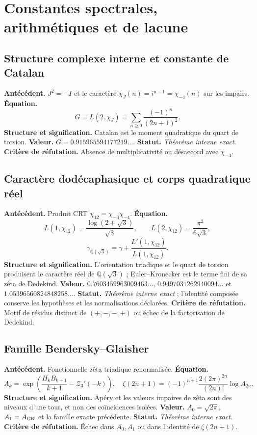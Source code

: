 \section{Constantes spectrales, arithmétiques et de lacune}

\subsection*{Structure complexe interne et constante de Catalan }
\textbf{Antécédent.} \(J^2=-I\) et le caractère
\(\chi_J(n)=i^{n-1}=\chi_{-4}(n)\) sur les impairs. \textbf{Équation.}
\[
G=L(2,\chi_J)=\sum_{n\ge0}\frac{(-1)^n}{(2n+1)^2}.
\]
\textbf{Structure et signification.} Catalan est le moment quadratique du
quart de torsion. \textbf{Valeur.} \(G=0.915965594177219\ldots\).
\textbf{Statut.} \emph{Théorème interne exact}. \textbf{Critère de réfutation.} Absence de
multiplicativité ou désaccord avec \(\chi_{-4}\).

\subsection*{Caractère dodécaphasique et corps quadratique réel }
\textbf{Antécédent.} Produit CRT
\(\chi_{12}=\chi_{-3}\chi_{-4}\). \textbf{Équation.}
\[
L(1,\chi_{12})=\frac{\log(2+\sqrt3)}{\sqrt3},
\qquad L(2,\chi_{12})=\frac{\pi^2}{6\sqrt3},
\]
\[
\gamma_{\mathbb Q(\sqrt3)}
=\gamma+\frac{L'(1,\chi_{12})}{L(1,\chi_{12})}.
\]
\textbf{Structure et signification.} L'orientation triadique et le quart de
torsion produisent le caractère réel de \(\mathbb Q(\sqrt3)\) ;
Euler--Kronecker est
le terme fini de sa zêta de Dedekind. \textbf{Valeur.}
\(0.7603459963009463\ldots\), \(0.9497031262940094\ldots\) et
\(1.05396560824848258\ldots\). \textbf{Statut.} \emph{Théorème interne exact} ;
l'identité composée conserve les hypothèses et les normalisations déclarées.
\textbf{Critère de réfutation.} Motif de résidus distinct de \((+,-,-,+)\) ou échec de
la factorisation de Dedekind.

\subsection*{Famille Bendersky--Glaisher }
\textbf{Antécédent.} Fonctionnelle zêta triadique renormalisée.
\textbf{Équation.}
\[
A_k=\exp\!\left(\frac{H_kB_{k+1}}{k+1}-\mathcal Z_3'(-k)\right),
\quad
\zeta(2n+1)=(-1)^{n+1}\frac{2(2\pi)^{2n}}{(2n)!}\log A_{2n}.
\]
\textbf{Structure et signification.} Apéry et les valeurs impaires de zêta sont des
niveaux d'une tour, et non des coïncidences isolées. \textbf{Valeur.}
\(A_0=\sqrt{2\pi}\), \(A_1=A_{\rm GK}\) et la famille exacte précédente.
\textbf{Statut.} \emph{Théorème interne exact}. \textbf{Critère de réfutation.} Échec dans
\(A_0,A_1\) ou dans l'identité de \(\zeta(2n+1)\).

